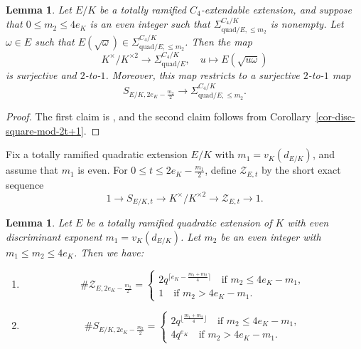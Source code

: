 \documentclass[11pt]{amsart}
\theoremstyle{theorem}
\newtheorem{lemma}[theorem]{Lemma}
\theoremstyle{example}
\theoremstyle{definition}
\numberwithin{theorem}{section}
\numberwithin{theorem}{section}
\newcommand{\quadr}{\mathrm{quad}}
\begin{document}
\begin{lemma}
    \label{lem-SE-to-SigmaE-2-to-1}
    Let $E/K$ be a totally ramified $C_4$-extendable extension, and suppose that $0 \leq m_2 \leq 4e_K$ is an even integer such that $\Sigma_{\quadr/E, \leq m_2}^{C_4/K}$ is nonempty. Let $\omega \in E$ such that $E(\sqrt{\omega}) \in \Sigma_{\quadr/E,\leq m_2}^{C_4/K}$. Then the map 
    $$
    K^\times / K^{\times 2} \to \Sigma_{\quadr/E}^{C_4/K},\quad u \mapsto E(\sqrt{u\omega})
    $$
    is surjective and $2$-to-$1$. Moreover, this map restricts to a surjective $2$-to-$1$ map 
    $$
    S_{E/K,2e_K - \frac{m_2}{2}} \to \Sigma_{\quadr/E,\leq m_2}^{C_4/K}.
    $$
\end{lemma}
\begin{proof}
    The first claim is \cite[Proposition~1.2]{cohen-et-al}, and the second claim follows from Corollary~\ref{cor-disc-square-mod-2t+1}.
\end{proof}
Fix a totally ramified quadratic extension $E/K$ with $m_1 = v_K(d_{E/K})$, and assume that $m_1$ is even. For $0 \leq t \leq 2e_K - \frac{m_1}{2}$, define $\mathcal{Z}_{E,t}$ by the short exact sequence 
$$
1 \to S_{E/K,t} \to K^\times / K^{\times 2} \to \mathcal{Z}_{E,t} \to 1. 
$$
\begin{lemma}
    \label{lem-size-of-Z-E-t-and-S-E/K-t}
    Let $E$ be a totally ramified quadratic extension of $K$ with even discriminant exponent $m_1 = v_K(d_{E/K})$. Let $m_2$ be an even integer with $m_1 \leq m_2 \leq 4e_K$. Then we have:
    \begin{enumerate} 
    \item $$
    \# \mathcal{Z}_{E,2e_K - \frac{m_2}{2}} = \begin{cases}
        2q^{\lceil e_K - \frac{m_1 + m_2}{4}\rceil} \quad \text{if $m_2 \leq 4e_K - m_1$},
        \\
        1 \quad\text{if $m_2 > 4e_K - m_1$}.
    \end{cases}
    $$
    \item $$
    \# S_{E/K,2e_K - \frac{m_2}{2}} = \begin{cases}
        2q^{\lfloor \frac{m_1+m_2}{4}\rfloor} \quad\text{if $m_2 \leq 4e_K - m_1$},
        \\
        4q^{e_K} \quad\text{if $m_2 > 4e_K - m_1$}. 
    \end{cases}
    $$
\end{enumerate}
\end{lemma}
\end{document}
